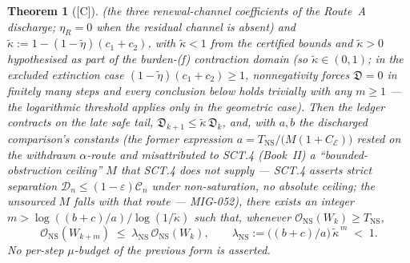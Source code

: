 \documentclass[12pt,oneside]{amsbook}
\theoremstyle{plain}
\newtheorem{theorem}{Theorem}[section]
\theoremstyle{definition}
\theoremstyle{remark}
\newcommand{\status}[1]{\textup{[#1]}}
\begin{document}
\begin{theorem}[\status{C}]
(the three renewal-channel coefficients of the Route~A discharge;
$\eta_R = 0$ when the residual channel is absent) and
$\widetilde\kappa := 1 - (1-\widetilde\eta)(c_1+c_2)$, with
$\widetilde\kappa < 1$ from the certified bounds and
$\widetilde\kappa > 0$ \emph{hypothesised as part of the
burden-(f) contraction domain} (so
$\widetilde\kappa \in (0,1)$; in the excluded extinction case
$(1-\widetilde\eta)(c_1+c_2) \geq 1$, nonnegativity forces
$\mathfrak{D} = 0$ in finitely many steps and every conclusion
below holds trivially with any $m \geq 1$ --- the logarithmic
threshold applies only in the geometric case). Then
the ledger contracts on the late safe tail,
$\mathfrak{D}_{k+1} \leq \widetilde\kappa\,\mathfrak{D}_k$,
and, with $a, b$ the discharged comparison's constants (the former
expression
$a = T_{\mathrm{NS}}/\bigl(M(1+C_{\mathcal{E}})\bigr)$ rested on
the withdrawn $\alpha$-route and misattributed to SCT.4 (Book~II) a
``bounded-obstruction ceiling'' $M$ that SCT.4 does not supply ---
SCT.4 asserts strict separation
$\mathcal{D}_n \leq (1-\varepsilon)\mathcal{C}_n$ under
non-saturation, no absolute ceiling; the unsourced $M$ falls with
that route --- MIG-052), there exists an integer
$m > \log((b+c)/a)/\log(1/\widetilde\kappa)$ such that, whenever
$\mathcal{O}_{\mathrm{NS}}(W_k) \geq T_{\mathrm{NS}}$,
\[
 \mathcal{O}_{\mathrm{NS}}(W_{k+m})
 \;\leq\; \lambda_{\mathrm{NS}}\,
 \mathcal{O}_{\mathrm{NS}}(W_k),
 \qquad
 \lambda_{\mathrm{NS}} := \bigl((b+c)/a\bigr)\,
 \widetilde\kappa^{\,m} \;<\; 1.
\]
No per-step $\mu$-budget of the previous form is asserted.
\end{theorem}
\end{document}

